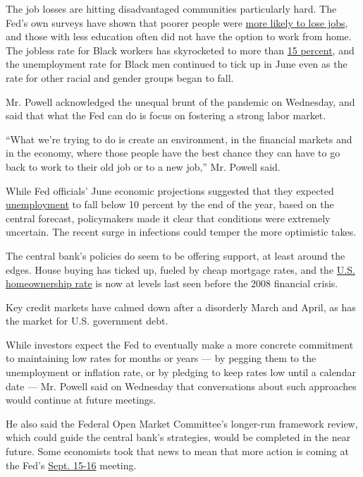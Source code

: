 The job losses are hitting disadvantaged communities particularly hard.
The Fed's own surveys have shown that poorer people were
\href{https://www.nytimes3xbfgragh.onion/2020/05/14/business/economy/coronavirus-jobless-unemployment.html}{more
likely to lose jobs}, and those with less education often did not have
the option to work from home. The jobless rate for Black workers has
skyrocketed to more than
\href{https://www.bls.gov/news.release/empsit.t02.htm}{15 percent}, and
the unemployment rate for Black men continued to tick up in June even as
the rate for other racial and gender groups began to fall.

Mr. Powell acknowledged the unequal brunt of the pandemic on Wednesday,
and said that what the Fed can do is focus on fostering a strong labor
market.

``What we're trying to do is create an environment, in the financial
markets and in the economy, where those people have the best chance they
can have to go back to work to their old job or to a new job,'' Mr.
Powell said.

While Fed officials' June economic projections suggested that they
expected
\href{https://www.federalreserve.gov/monetarypolicy/files/fomcprojtabl20200610.pdf}{unemployment}
to fall below 10 percent by the end of the year, based on the central
forecast, policymakers made it clear that conditions were extremely
uncertain. The recent surge in infections could temper the more
optimistic takes.

The central bank's policies do seem to be offering support, at least
around the edges. House buying has ticked up, fueled by cheap mortgage
rates, and the
\href{https://www.bloomberg.com/news/articles/2020-07-28/homeownership-rate-in-the-u-s-soars-to-highest-level-since-2008?sref=oZtxD6sa}{U.S.
homeownership rate} is now at levels last seen before the 2008 financial
crisis.

Key credit markets have calmed down after a disorderly March and April,
as has the market for U.S. government debt.

While investors expect the Fed to eventually make a more concrete
commitment to maintaining low rates for months or years --- by pegging
them to the unemployment or inflation rate, or by pledging to keep rates
low until a calendar date --- Mr. Powell said on Wednesday that
conversations about such approaches would continue at future meetings.

He also said the Federal Open Market Committee's longer-run framework
review, which could guide the central bank's strategies, would be
completed in the near future. Some economists took that news to mean
that more action is coming at the Fed's
\href{https://www.federalreserve.gov/monetarypolicy/fomccalendars.htm}{Sept.
15-16} meeting.


